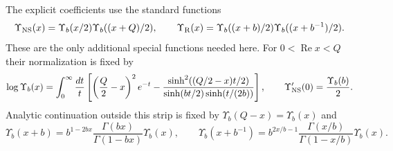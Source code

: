 The explicit coefficients use the standard functions
\begin{equation}
 \Upsilon_{\mathrm{NS}}(x)=\Upsilon_b(x/2)\Upsilon_b((x+Q)/2),\qquad
 \Upsilon_{\mathrm R}(x)=\Upsilon_b((x+b)/2)\Upsilon_b((x+b^{-1})/2).
 \label{eq:partition-upsilon}
\end{equation}
These are the only additional special functions needed here.
For $0<\operatorname{Re}x<Q$ their normalization is fixed by
\begin{equation}
 \log\Upsilon_b(x)=\int_0^\infty\frac{dt}{t}
 \left[\left(\frac Q2-x\right)^2e^{-t}
 -\frac{\sinh^2((Q/2-x)t/2)}
 {\sinh(bt/2)\sinh(t/(2b))}\right],\qquad
 \Upsilon'_{\mathrm{NS}}(0)=\frac{\Upsilon_b(b)}2.
 \label{eq:partition-upsilon-definition}
\end{equation}
Analytic continuation outside this strip is fixed by
$\Upsilon_b(Q-x)=\Upsilon_b(x)$ and
\begin{equation}
 \Upsilon_b(x+b)=b^{1-2bx}
 \frac{\Gamma(bx)}{\Gamma(1-bx)}\Upsilon_b(x),\qquad
 \Upsilon_b(x+b^{-1})=b^{2x/b-1}
 \frac{\Gamma(x/b)}{\Gamma(1-x/b)}\Upsilon_b(x).
\end{equation}

